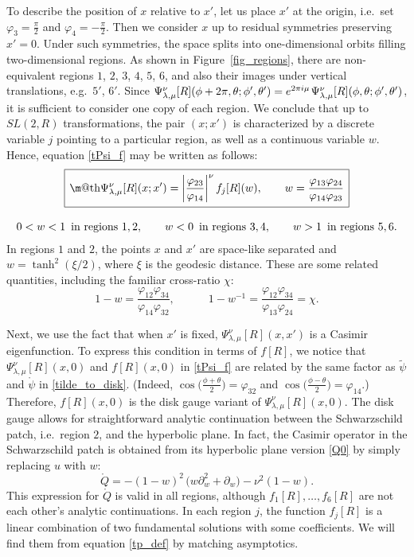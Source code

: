 \documentclass[11pt]{article}
\makeatletter
\newcommand*{\wideboxed}[1]{\setlength{\fboxsep}{1ex}%
  \fbox{\m@th$\displaystyle#1$}}
\newcommand{\vp}{\varphi}
\newcommand{\RR}{\mathbb{R}}
\DeclareMathOperator{\SL}{SL}
\newcommand{\tpsi}{\tilde{\psi}}
\newcommand{\rpsi}{\mathring{\psi}}
\newcommand{\rQ}{\mathring{Q}}
\def\ie{i.e.\ }
\def\widetilde#1{#1}%
\def\SL{SL}
\def\RR{R}
\makeatother
\begin{document}
To describe the position of $x$ relative to $x'$, let us place $x'$ at the origin, \ie set $\vp_3=\frac{\pi}{2}$ and $\vp_4=-\frac{\pi}{2}$. Then we consider $x$ up to residual symmetries preserving $x'=0$. Under such symmetries, the space splits into one-dimensional orbits filling two-dimensional regions. As shown in Figure~\ref{fig_regions}, there are non-equivalent regions $1$, $2$, $3$, $4$, $5$, $6$, and also their images under vertical translations, e.g.\ $5'$, $6'$. Since $\Psi^{\nu}_{\lambda,\mu}[R](\phi+2\pi,\theta;\phi',\theta') =e^{2\pi i\mu}\kern1pt \Psi^{\nu}_{\lambda,\mu}[R](\phi,\theta;\phi',\theta')$, it is sufficient to consider one copy of each region. We conclude that up to $\widetilde{\SL}(2,\RR)$ transformations, the pair $(x;x')$ is characterized by a discrete variable $j$ pointing to a particular region, as well as a continuous variable $w$. Hence, equation \eqref{tPsi_f} may be written as follows:
\begin{gather}
\label{tPsi_fj}
\wideboxed{
\Psi^{\nu}_{\lambda,\mu}[R](x;x')
=\left|\frac{\vp_{23}}{\vp_{14}}\right|^{\nu}f_{j}[R](w),\qquad
w=\frac{\vp_{13}\vp_{24}}{\vp_{14}\vp_{23}}
}\\[8pt]
0<w<1\, \text{ in regions }1,2,\qquad
w<0\, \text{ in regions }3,4,\qquad
w>1\, \text{ in regions }5,6.
\end{gather}
In regions $1$ and $2$, the points $x$ and $x'$ are space-like separated and $w=\tanh^2(\xi/2)$, where $\xi$ is the geodesic distance. These are some related quantities, including the familiar cross-ratio $\chi$:
\begin{equation}
1-w=\frac{\vp_{12}\vp_{34}}{\vp_{14}\vp_{32}},\qquad\quad
1-w^{-1}=\frac{\vp_{12}\vp_{34}}{\vp_{13}\vp_{24}}=\chi.
\end{equation}

Next, we use the fact that when $x'$ is fixed, $\Psi^{\nu}_{\lambda,\mu}[R](x,x')$ is a Casimir eigenfunction. To express this condition in terms of $f[R]$, we notice that $\Psi^{\nu}_{\lambda,\mu}[R](x,0)$ and $f[R](x,0)$ in \eqref{tPsi_f} are related by the same factor as $\tpsi$ and $\rpsi$ in \eqref{tilde_to_disk}. (Indeed, $\cos\bigl(\frac{\phi+\theta}{2}\bigr)=\vp_{32}$ and $\cos\bigl(\frac{\phi-\theta}{2}\bigr)=\vp_{14}$.) Therefore, $f[R](x,0)$ is the disk gauge variant of $\Psi^{\nu}_{\lambda,\mu}[R](x,0)$. The disk gauge allows for straightforward analytic continuation between the Schwarzschild patch, \ie region $2$, and the hyperbolic plane. In fact, the Casimir operator in the Schwarzschild patch  is obtained from its hyperbolic plane version \eqref{Q0} by simply replacing $u$ with $w$:
\begin{equation}
\rQ=-(1-w)^2\,\bigl(w\partial_{w}^2+\partial_{w}\bigr)-\nu^2(1-w).
\end{equation}
This expression for $\rQ$ is valid in all regions, although $f_{1}[R],\ldots,f_{6}[R]$ are not each other's analytic continuations. In each region $j$, the function $f_{j}[R]$ is a linear combination of two fundamental solutions with some coefficients. We will find them from equation \eqref{tp_def} by matching asymptotics.
\end{document}
